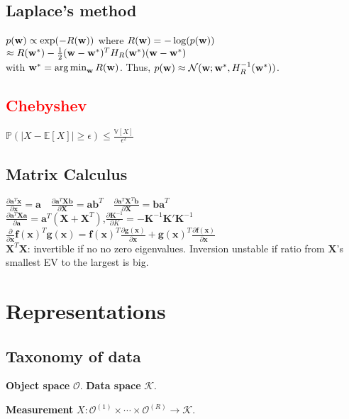 \subsection*{Laplace's method}
$p({\mathbf{w}}) \propto \exp(-R({\mathbf{w}}))$ where $R({\mathbf{w}}) = -\log(p({\mathbf{w}}))$\\ $\approx R({\mathbf{w}}^*) - \frac{1}{2}({\mathbf{w}}-{\mathbf{w}}^*)^TH_R({\mathbf{w}}^*)({\mathbf{w}}-{\mathbf{w}}^*)$\\ with ${\mathbf{w}}^* = \operatorname*{arg\,min}_{\mathbf{w}} R({\mathbf{w}})$. Thus, $p({\mathbf{w}}) \approx \mathcal{N}({\mathbf{w}};{\mathbf{w}}^*, H_R^{-1}({\mathbf{w}}^*))$.

\subsection*{\textcolor{red}{Chebyshev}}
$\mathbb{P}(|X-\mathbb{E}[X]|\geq \epsilon)\leq \frac{\mathbb{V}[X]}{\epsilon^2}$\\

\subsection*{Matrix Calculus}
$\frac{\partial \mathbf{a}^T\mathbf{x}}{\partial\mathbf{x}}{=}\mathbf{a} \quad \frac{\partial \mathbf{a}^T\mathbf{Xb}}{\partial\mathbf{X}}{=}\mathbf{ab}^T \quad \frac{\partial \mathbf{a}^T\mathbf{X}^T\mathbf{b}}{\partial\mathbf{X}}{=}\mathbf{ba}^T $\\
$\frac{\partial \mathbf{a}^T\mathbf{Xa}}{\partial\mathbf{a}}{=}\mathbf{a}^T(\mathbf{X}+\mathbf{X}^T)$,$\frac{\partial \mathbf{K}^{-1}}{\partial K}=-\mathbf{K}^{-1}\mathbf{K}'\mathbf{K}^{-1}$\\
 $\frac{\partial}{\partial\mathbf{x}} \mathbf{f(x)}^T\mathbf{g(x)}{=}\mathbf{f(x)}^T\frac{\partial \mathbf{g(x)}}{\partial\mathbf{x}}+\mathbf{g(x)}^T\frac{\partial\mathbf{f(x)}}{\partial\mathbf{x}}$\\
$\mathbf{X}^T\mathbf{X}$: invertible if no no zero eigenvalues.
Inversion unstable if ratio from $\mathbf{X}$'s smallest EV to the largest is big.

\section*{Representations}
\subsection*{Taxonomy of data}
\textbf{Object space} $\mathcal{O}$. \textbf{Data space} $\mathcal{K}$.

\textbf{Measurement} $X:\mathcal{O}^{(1)}\times\cdots\times\mathcal{O}^{(R)} \rightarrow \mathcal{K}$.

